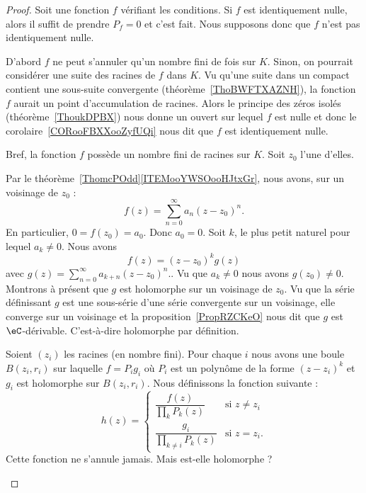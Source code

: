 \begin{proof}
	Soit une fonction \( f\) vérifiant les conditions. Si \( f\) est identiquement nulle, alors il suffit de prendre \( P_f=0\) et c'est fait. Nous supposons donc que \( f\) n'est pas identiquement nulle.

	\begin{subproof}

		D'abord \( f\) ne peut s'annuler qu'un nombre fini de fois sur \( K\). Sinon, on pourrait considérer une suite des racines de \( f\) dans \( K\). Vu qu'une suite dans un compact contient une sous-suite convergente (théorème~\ref{ThoBWFTXAZNH}), la fonction \( f\) aurait un point d'accumulation de racines. Alors le principe des zéros isolés (théorème~\ref{ThoukDPBX}) nous donne un ouvert sur lequel \( f\) est nulle et donc le corolaire~\ref{CORooFBXXooZyfUQi} nous dit que \( f\) est identiquement nulle.


		Bref, la fonction \( f\) possède un nombre fini de racines sur \( K\). Soit \( z_0\) l'une d'elles.

		Par le théorème~\ref{ThomcPOdd}\ref{ITEMooYWSOooHJtxGr}, nous avons, sur un voisinage de \( z_0\) :
		\begin{equation}
			f(z)=\sum_{n=0}^{\infty}a_n(z-z_0)^n.
		\end{equation}
		En particulier, \( 0=f(z_0)=a_0\). Donc \( a_0=0\). Soit \( k\), le plus petit naturel pour lequel \( a_k\neq 0\). Nous avons
		\begin{equation}
			f(z)=(z-z_0)^kg(z)
		\end{equation}
		avec \( g(z)= \sum_{n=0}^{\infty}a_{k+n}(z-z_0)^n.\). Vu que \( a_{k}\neq 0\) nous avons \( g(z_0)\neq 0\). Montrons à présent que \( g\) est holomorphe sur un voisinage de \( z_0\). Vu que la série définissant \( g\) est une sous-série d'une série convergente sur un voisinage, elle converge sur un voisinage et la proposition~\ref{PropRZCKeO} nous dit que \( g\) est \( \eC\)-dérivable. C'est-à-dire holomorphe par définition.


		Soient \( (z_i)\) les racines (en nombre fini). Pour chaque \( i\) nous avons une boule \( B(z_i,r_i)\) sur laquelle \( f=P_ig_i\) où \( P_i\) est un polynôme de la forme \( (z-z_i)^k\) et \( g_i\) est holomorphe sur \( B(z_i,r_i)\). Nous définissons la fonction suivante :
		\begin{equation}
			h(z)=\begin{cases}
				\dfrac{ f(z) }{ \prod_kP_k(z) }        & \text{si } z\neq z_i \\
				\dfrac{ g_i }{ \prod_{k\neq i}P_k(z) } & \text{si } z=z_i.
			\end{cases}
		\end{equation}
		Cette fonction ne s'annule jamais. Mais est-elle holomorphe ?


\end{subproof}
\end{proof}
